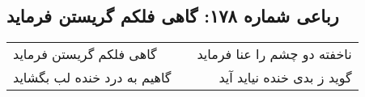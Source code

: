 \begin{center}
\section*{رباعی شماره ۱۷۸: گاهی فلکم گریستن فرماید}
\label{sec:sh178}
\begin{longtable}{l p{0.5cm} r}
گاهی فلکم گریستن فرماید
&&
ناخفته دو چشم را عنا فرماید
\\
گاهیم به درد خنده لب بگشاید
&&
گوید ز بدی خنده نیاید آید
\\
\end{longtable}
\end{center}
